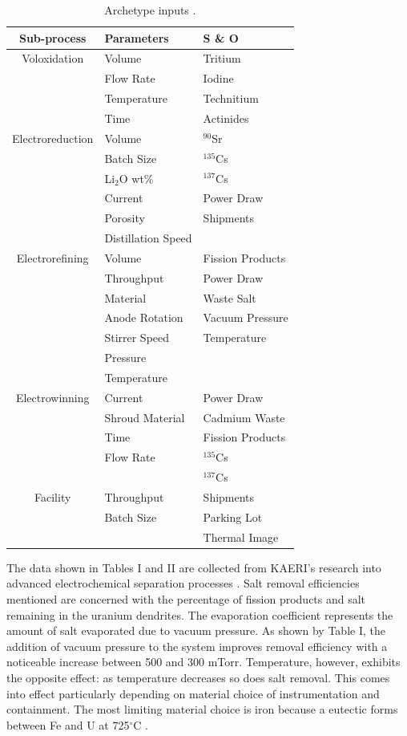 \documentclass{anstrans}
\begin{document}
\begin{table}[h]
	\centering
	\begin{tabularx}{0.5\textwidth}{cll}
		\hline
		\textbf{Sub-process} & \textbf{Parameters} & \textbf{S \& O} \\
		\hline
		Voloxidation & Volume & Tritium \\
		& Flow Rate &  Iodine\\
		& Temperature & Technitium \\
		& Time & Actinides\\ \hline
		Electroreduction & Volume & $^{90}$Sr \\
		& Batch Size & $^{135}$Cs \\
		& Li$_2$O wt\% & $^{137}$Cs \\
		& Current & Power Draw \\
		& Porosity & Shipments \\
		& Distillation Speed & \\ \hline
		Electrorefining & Volume & Fission Products\\
		& Throughput & Power Draw \\
		& Material & Waste Salt \\
		& Anode Rotation & Vacuum Pressure\\
		& Stirrer Speed & Temperature \\
		& Pressure & \\
		& Temperature & \\ \hline
		Electrowinning & Current & Power Draw \\
		& Shroud Material & Cadmium Waste \\
		& Time & Fission Products \\
		& Flow Rate & $^{135}$Cs \\
		&  & $^{137}$Cs \\ \hline
		Facility & Throughput & Shipments \\
		& Batch Size & Parking Lot \\
		& & Thermal Image \\
		\hline
	\end{tabularx}
	\caption {Archetype inputs  \cite{lee_advanced_nodate}.}
	\label {tab:pressure}
\end{table}

The data shown in Tables I and II are collected from KAERI's research into advanced electrochemical separation processes
\cite{lee_advanced_nodate}. Salt removal efficiencies mentioned are concerned with the percentage of fission products 
and salt remaining in the uranium dendrites. The evaporation coefficient represents the amount of salt evaporated due 
to vacuum pressure. As shown by Table I, the addition of vacuum pressure to the system improves removal efficiency 
with a noticeable increase between 500 and 300 mTorr. Temperature, however, exhibits the opposite effect: as temperature 
decreases so does salt removal. This comes into effect particularly depending on material choice of instrumentation and 
containment. The most limiting material choice is iron because a eutectic forms between Fe and U at 725$^{\circ}$C \cite{chapman_revision_1984}.
\end{document}
